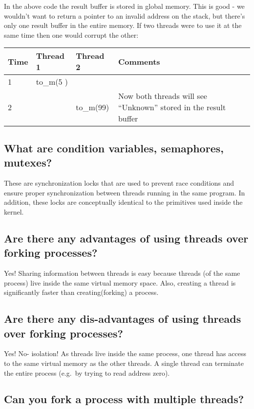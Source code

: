 In the above code the result buffer is stored in global memory. This is good - we wouldn't want to return a pointer to an invalid address on the stack, but there's only one result buffer in the entire memory. If two threads were to use it at the same time then one would corrupt the other:

\begin{longtable}[c]{@{}llll@{}}
\toprule
Time & Thread 1 & Thread 2 & Comments\tabularnewline
\midrule
\endhead
1 & to\_m(5 ) &\tabularnewline
2 & & to\_m(99) & Now both threads will see ``Unknown'' stored in the result buffer\tabularnewline
\bottomrule
\end{longtable}

\subsection{What are condition variables, semaphores, mutexes?}\label{what-are-condition-variables-semaphores-mutexes}

These are synchronization locks that are used to prevent race conditions and ensure proper synchronization between threads running in the same program. In addition, these locks are conceptually identical to the primitives used inside the kernel.

\subsection{Are there any advantages of using threads over forking processes?}\label{are-there-any-advantages-of-using-threads-over-forking-processes}

Yes! Sharing information between threads is easy because threads (of the same process) live inside the same virtual memory space. Also, creating a thread is significantly faster than creating(forking) a process.

\subsection{Are there any dis-advantages of using threads over forking processes?}\label{are-there-any-dis-advantages-of-using-threads-over-forking-processes}

Yes! No- isolation! As threads live inside the same process, one thread has access to the same virtual memory as the other threads. A single thread can terminate the entire process (e.g.~by trying to read address zero).

\subsection{Can you fork a process with multiple threads?}\label{can-you-fork-a-process-with-multiple-threads}

